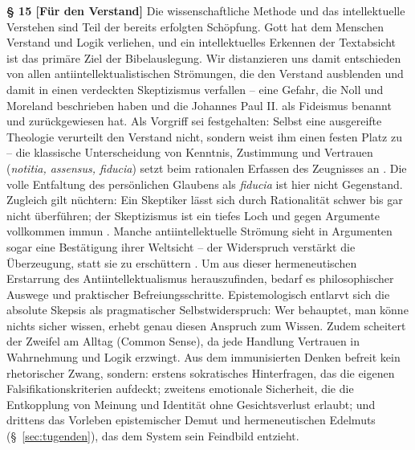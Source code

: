 \documentclass[11pt,a4paper]{article}
\makeatletter
\newcommand{\apthsec}[3]{%
  \phantomsection%
  \def\@currentlabel{#1}%
  \label{sec:#3}%
  \textbf{§ #1 [#2]}%
}
\makeatother
\begin{document}
\apthsec{15}{Für den Verstand}{kategorial} Die wissenschaftliche Methode und das intellektuelle Verstehen sind Teil der bereits erfolgten Schöpfung. Gott hat dem Menschen Verstand und Logik verliehen, und ein intellektuelles Erkennen der Textabsicht ist das primäre Ziel der Bibelauslegung. Wir distanzieren uns damit entschieden von allen antiintellektualistischen Strömungen, die den Verstand ausblenden und damit in einen verdeckten Skeptizismus verfallen – eine Gefahr, die Noll \citeyearpar{noll1994} und Moreland \citeyearpar{moreland1997} beschrieben haben und die Johannes Paul II. \citeyearpar{fidesetratio1998} als Fideismus benannt und zurückgewiesen hat. Als Vorgriff sei festgehalten: Selbst eine ausgereifte Theologie verurteilt den Verstand nicht, sondern weist ihm einen festen Platz zu – die klassische Unterscheidung von Kenntnis, Zustimmung und Vertrauen (\textit{notitia, assensus, fiducia}) setzt beim rationalen Erfassen des Zeugnisses an \citep{calvin1559}. Die volle Entfaltung des persönlichen Glaubens als \textit{fiducia} ist hier nicht Gegenstand. Zugleich gilt nüchtern: Ein Skeptiker lässt sich durch Rationalität schwer bis gar nicht überführen; der Skeptizismus ist ein tiefes Loch und gegen Argumente vollkommen immun \citep{wittgenstein1969}. Manche antiintellektuelle Strömung sieht in Argumenten sogar eine Bestätigung ihrer Weltsicht – der Widerspruch verstärkt die Überzeugung, statt sie zu erschüttern \citep{festinger1956,noll1994}. Um aus dieser hermeneutischen Erstarrung des Antiintellektualismus herauszufinden, bedarf es philosophischer Auswege und praktischer Befreiungsschritte. Epistemologisch entlarvt sich die absolute Skepsis als pragmatischer Selbstwiderspruch: Wer behauptet, man könne nichts sicher wissen, erhebt genau diesen Anspruch zum Wissen. Zudem scheitert der Zweifel am Alltag (Common Sense), da jede Handlung Vertrauen in Wahrnehmung und Logik erzwingt. Aus dem immunisierten Denken befreit kein rhetorischer Zwang, sondern: erstens sokratisches Hinterfragen, das die eigenen Falsifikationskriterien aufdeckt; zweitens emotionale Sicherheit, die die Entkopplung von Meinung und Identität ohne Gesichtsverlust erlaubt; und drittens das Vorleben epistemischer Demut und hermeneutischen Edelmuts (§~\ref{sec:tugenden}), das dem System sein Feindbild entzieht.
\end{document}
